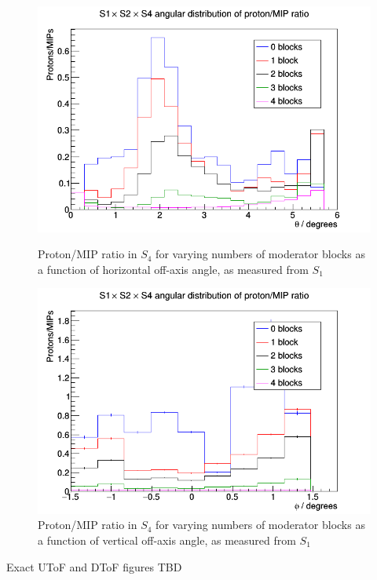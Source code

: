    	\begin{figure}[ht]
   		\begin{minipage}[t]{0.48\textwidth}
   			\centering
   			\includegraphics[width=\textwidth]{files/Figures/ratioS4Horz}
   			\caption{Proton/MIP ratio in $S_{4}$ for varying numbers of moderator blocks as a function of horizontal off-axis angle, as measured from $S_{1}$}
   			\label{fig:propiratio_s4_horz}
   		\end{minipage}
   		\hspace{0.3cm}
    	\begin{minipage}[t]{0.48\textwidth}
    		\centering
    		\includegraphics[width=\textwidth]{files/Figures/ratioS4Vert}
    		\caption{Proton/MIP ratio in $S_{4}$ for varying numbers of moderator blocks as a function of vertical off-axis angle, as measured from $S_{1}$}
    		\label{fig:propiratio_s4_vert}
    	\end{minipage}	
   	\end{figure}
	

Exact UToF and DToF figures TBD